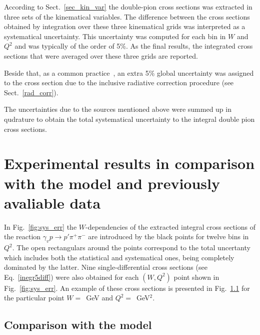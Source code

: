 \documentclass[prc,twocolumn,superscriptaddress,showpacs,amssymb,amsmath,amsfonts,linenumbers,aps]{revtex4-1}
\begin{document}
According to Sect.~\ref{sec_kin_var} the double-pion cross sections was extracted in three sets of the  kinematical variables. The difference between the cross sections obtained by integration over these three kinematical grids was interpreted as a systematical uncertainty. This  uncertainty was computed for each bin in $W$ and $Q^{2}$ and was typically of the order of 5\%.
As the final results, the integrated cross sections that were averaged over these three grids are reported.


Beside that, as a common practice~\cite{Fedotov:2008aa,Isupov:2017lnd},  an extra 5\% global uncertainty was assigned to the cross section due to the inclusive radiative correction procedure (see Sect.~\ref{rad_corr}).


The uncertainties due to the sources mentioned above were summed up in qudrature to obtain the total systematical uncertainty to the integral double pion cross sections.



\section{Experimental results in comparison with the model and previously avaliable data}

In Fig.~\ref{fig:sys_err} the $W$-dependencies of the extracted integral cross sections of the reaction $\gamma_{v} p \rightarrow p' \pi^{+} \pi^{-}$ are introduced by the black points for twelve bins in $Q^{2}$. The open rectangulars around the points correspond to the total uncertanty which includes both the statistical and systematical ones, being completely dominated by the latter. Nine single-differential cross sections (see Eq.~\eqref{inegr5diff}) were also obtained for each $(W,Q^{2})$ point shown in Fig.~\ref{fig:sys_err}. An example of these cross sections is presented in Fig.~\ref{} for the particular point  $W =$~GeV and $Q^{2} =$~GeV$^{2}$. 

\subsection{Comparison with the model }
\end{document}
